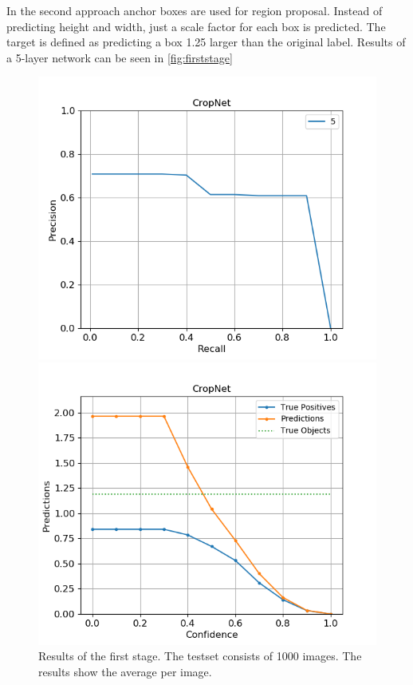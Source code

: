 \documentclass{article}
\begin{document}
In the second approach anchor boxes are used for region proposal. Instead of predicting height and width, just a scale factor for each box is predicted. The target is defined as predicting a box 1.25 larger than the original label. Results of a 5-layer network can be seen in \autoref{fig:firststage}

\begin{figure}[h]
	\begin{minipage}{0.5\textwidth}
		\includegraphics[width=\textwidth]{cropnet.png}
	\end{minipage}
	\begin{minipage}{0.5\textwidth}
		\includegraphics[width=\textwidth]{cropnet_predictions.png}
	\end{minipage}
	
	\label{fig:firststage}
	
	\caption{Results of the first stage. The testset consists of 1000 images. The results show the average per image.}
\end{figure}
\end{document}

